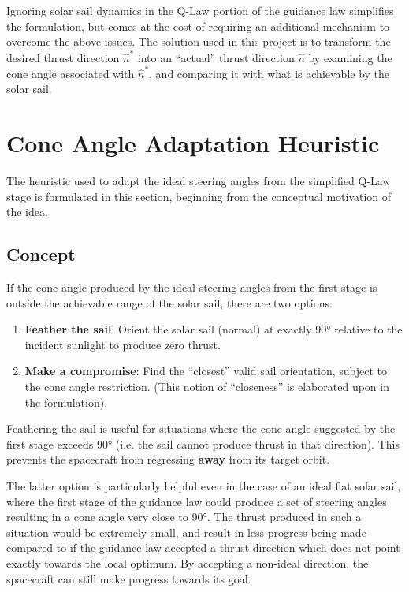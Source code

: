Ignoring solar sail dynamics in the Q-Law portion of the guidance law simplifies the formulation, but comes at the cost of requiring an additional mechanism to overcome the above issues. The solution used in this project is to transform the desired thrust direction \(\hat{n}^*\) into an ``actual'' thrust direction \(\hat{n}\) by examining the cone angle associated with \(\hat{n}^*\), and comparing it with what is achievable by the solar sail.

\section{Cone Angle Adaptation Heuristic}
The heuristic used to adapt the ideal steering angles from the simplified Q-Law stage is formulated in this section, beginning from the conceptual motivation of the idea.

\subsection{Concept}
If the cone angle produced by the ideal steering angles from the first stage is outside the achievable range of the solar sail, there are two options:
\begin{enumerate}
    \setlength{\parskip}{2pt}
    \item \textbf{Feather the sail}: Orient the solar sail (normal) at exactly \ang{90} relative to the incident sunlight to produce zero thrust.
    \item \textbf{Make a compromise}: Find the ``closest'' valid sail orientation, subject to the cone angle restriction. (This notion of ``closeness'' is elaborated upon in the formulation).
\end{enumerate}

Feathering the sail is useful for situations where the cone angle suggested by the first stage exceeds \ang{90} (i.e. the sail cannot produce thrust in that direction). This prevents the spacecraft from regressing \textbf{away} from its target orbit.

The latter option is particularly helpful even in the case of an ideal flat solar sail, where the first stage of the guidance law could produce a set of steering angles resulting in a cone angle very close to \ang{90}. The thrust produced in such a situation would be extremely small, and result in less progress being made compared to if the guidance law accepted a thrust direction which does not point exactly towards the local optimum. By accepting a non-ideal direction, the spacecraft can still make progress towards its goal.

